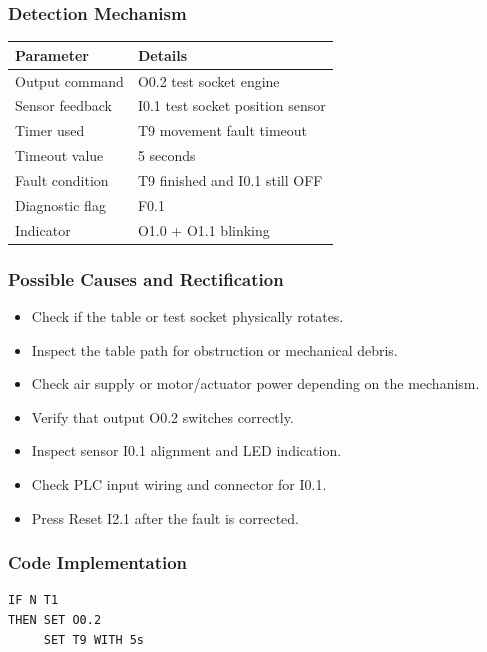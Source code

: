 \subsubsection{Detection Mechanism}

\begin{longtable}{|p{3.6cm}|p{9.2cm}|}
\hline
Parameter & Details \\
\hline
Output command & O0.2 test socket engine \\
\hline
Sensor feedback & I0.1 test socket position sensor \\
\hline
Timer used & T9 movement fault timeout \\
\hline
Timeout value & 5 seconds \\
\hline
Fault condition & T9 finished and I0.1 still OFF \\
\hline
Diagnostic flag & F0.1 \\
\hline
Indicator & O1.0 + O1.1 blinking \\
\hline
\end{longtable}

\subsubsection{Possible Causes and Rectification}

\begin{itemize}
    \item Check if the table or test socket physically rotates.
    \item Inspect the table path for obstruction or mechanical debris.
    \item Check air supply or motor/actuator power depending on the mechanism.
    \item Verify that output O0.2 switches correctly.
    \item Inspect sensor I0.1 alignment and LED indication.
    \item Check PLC input wiring and connector for I0.1.
    \item Press Reset I2.1 after the fault is corrected.
\end{itemize}

\subsubsection{Code Implementation}

\begin{verbatim}
IF N T1
THEN SET O0.2
     SET T9 WITH 5s
\end{verbatim}

